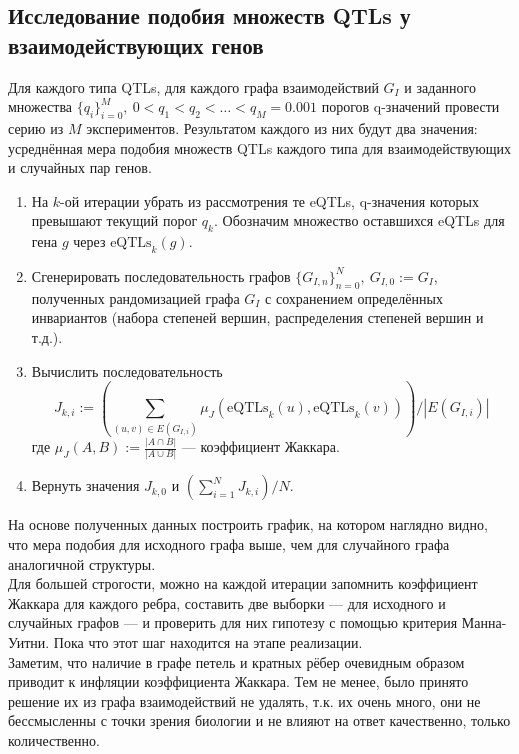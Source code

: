 \documentclass[11pt,a4paper]{report}
\theoremstyle{definition}
\theoremstyle{definition}
\theoremstyle{definition}
\begin{document}
	\subsection{Исследование подобия множеств QTLs у взаимодействующих генов}
	Для каждого типа QTLs, для каждого графа взаимодействий $ G_{I} $ и заданного множества $ \{q_{i}\}_{i=0}^{M},\ 0 < q_{1} < q_{2} < \dots < q_{M} = 0.001 $ порогов q-значений провести серию из $ M $ экспериментов. Результатом каждого из них будут два значения: усреднённая мера подобия множеств QTLs каждого типа для взаимодействующих и случайных пар генов.
	\begin{enumerate}
		\item На $ k $-ой итерации убрать из рассмотрения те eQTLs, q-значения которых превышают текущий порог $ q_{k} $. Обозначим множество оставшихся eQTLs для гена $ g $ через $ \mbox{eQTLs}_{k}(g) $.
		\item Сгенерировать последовательность графов $ \{G_{I, n}\}_{n=0}^{N},\  G_{I, 0} := G_{I} $, полученных рандомизацией графа $ G_{I} $ с сохранением определённых инвариантов (набора степеней вершин, распределения степеней вершин и т.д.). 
		\item Вычислить последовательность \[ J_{k, i} := \left (\sum_{(u, v) \in E(G_{I, i})}{\mu_{J}\left (\mbox{eQTLs}_{k}(u), \mbox{eQTLs}_{k}(v)\right )}\right )/\left |E(G_{I, i})\right |\]
		где $ \mu_{J}(A, B) := \frac{|A \cap B|}{|A \cup B|} $ — коэффициент Жаккара.
		\item Вернуть значения $ J_{k,0} $ и $ \left (\sum_{i=1}^{N}{J_{k,i}}\right )/N $.
	\end{enumerate}
	На основе полученных данных построить график, на котором наглядно видно, что мера подобия для исходного графа выше, чем для случайного графа аналогичной структуры.\\
	Для большей строгости, можно на каждой итерации запомнить коэффициент Жаккара для каждого ребра, составить две выборки — для исходного и случайных графов — и проверить для них гипотезу с помощью критерия Манна-Уитни. Пока что этот шаг находится на этапе реализации.\\
	Заметим, что наличие в графе петель и кратных рёбер очевидным образом приводит к инфляции коэффициента Жаккара. Тем не менее, было принято решение их из графа взаимодействий не удалять, т.к. их очень много, они не бессмысленны с точки зрения биологии и не влияют на ответ качественно, только количественно.
\end{document}
